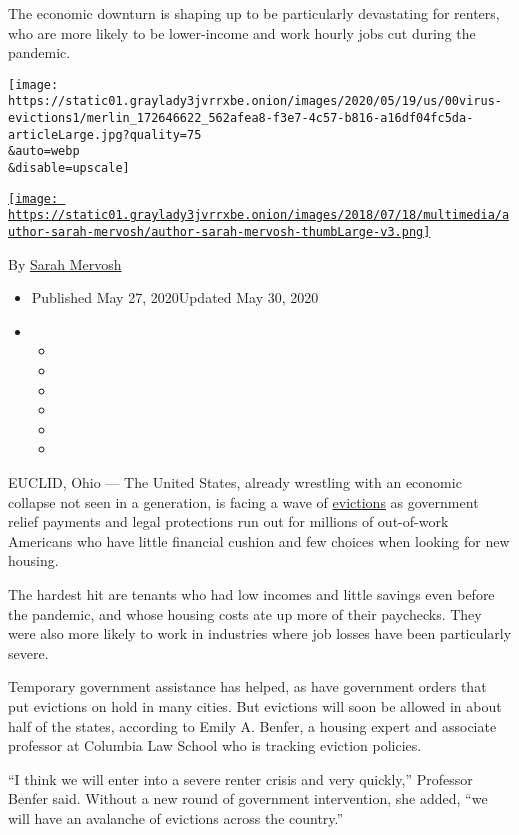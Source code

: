 The economic downturn is shaping up to be particularly devastating for
renters, who are more likely to be lower-income and work hourly jobs cut
during the pandemic.

\texttt{[image: https://static01.graylady3jvrrxbe.onion/images/2020/05/19/us/00virus-evictions1/merlin\_172646622\_562afea8-f3e7-4c57-b816-a16df04fc5da-articleLarge.jpg?quality=75\\\&auto=webp\\\&disable=upscale]}

\href{https://www.nytimes3xbfgragh.onion/by/sarah-mervosh}{\texttt{[image: https://static01.graylady3jvrrxbe.onion/images/2018/07/18/multimedia/author-sarah-mervosh/author-sarah-mervosh-thumbLarge-v3.png]}}

By \href{https://www.nytimes3xbfgragh.onion/by/sarah-mervosh}{Sarah
Mervosh}

\begin{itemize}
\item
  Published May 27, 2020Updated May 30, 2020
\item
  \begin{itemize}
  \item
  \item
  \item
  \item
  \item
  \item
  \end{itemize}
\end{itemize}

EUCLID, Ohio --- The United States, already wrestling with an economic
collapse not seen in a generation, is facing a wave of
\href{https://www.nytimes3xbfgragh.onion/2020/07/23/business/evictions-moratorium-cares-act.html}{evictions}
as government relief payments and legal protections run out for millions
of out-of-work Americans who have little financial cushion and few
choices when looking for new housing.

The hardest hit are tenants who had low incomes and little savings even
before the pandemic, and whose housing costs ate up more of their
paychecks. They were also more likely to work in industries where job
losses have been particularly severe.

Temporary government assistance has helped, as have government orders
that put evictions on hold in many cities. But evictions will soon be
allowed in about half of the states, according to Emily A. Benfer, a
housing expert and associate professor at Columbia Law School who is
tracking eviction policies.

``I think we will enter into a severe renter crisis and very quickly,''
Professor Benfer said. Without a new round of government intervention,
she added, ``we will have an avalanche of evictions across the
country.''

